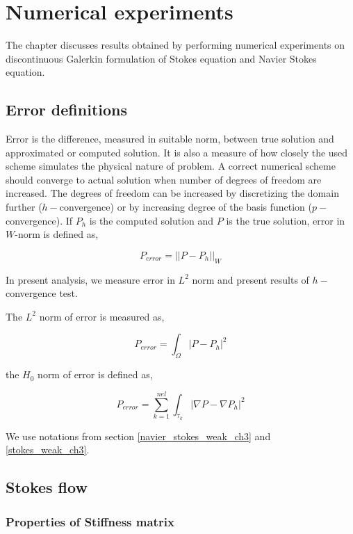 \documentclass[a4paper]{book}
\begin{document}
\chapter{Numerical experiments}

The chapter discusses results obtained by performing numerical experiments on discontinuous Galerkin formulation of Stokes equation and Navier Stokes equation.

\section{Error definitions}

Error is the difference, measured in suitable norm, between true solution and approximated or computed solution. It is also a measure of how closely the used scheme simulates the physical nature of problem. A correct numerical scheme should converge to actual solution when number of degrees of freedom are increased. The degrees of freedom can be increased by discretizing the domain further ($h-$convergence) or by increasing degree of the basis function ($p-$convergence). If $P_h$ is the computed solution and $P$ is the true solution, error in $W$-norm is defined as,

\begin{equation} \label{error_definition}
P_{error} = ||P - P_h||_{W}
\end{equation}

In present analysis, we measure error in $L^2$ norm and present results of $h-$convergence test.

The $L^2$ norm of error is measured as,

\begin{equation}
P_{error} = \int_{\Omega} |P - P_h|^2
\end{equation}

the $H_0$ norm of error is defined as,

\begin{equation}
P_{error} = \sum_{k=1}^{nel} \int_{\tau_k} |\nabla P - \nabla P_h|^2
\end{equation}


We use notations from section \ref{navier_stokes_weak_ch3} and \ref{stokes_weak_ch3}.

\section{Stokes flow}\label{Stokes-ch5}

\subsection{Properties of Stiffness matrix}
\end{document}

